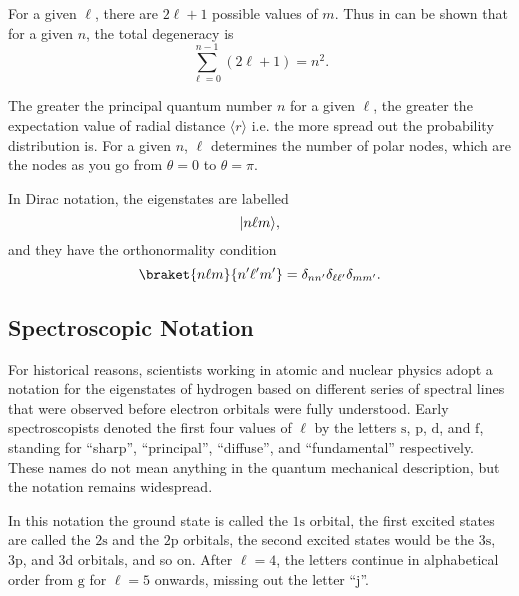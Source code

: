 \documentclass[../quantum_mechanics.tex]{subfiles}
\begin{document}
            For a given $\ell$, there are $2\ell+1$ possible values of $m$.
            Thus in can be shown that for a given $n$, the total degeneracy is
            \begin{equation}
                \sum_{\ell=0}^{n-1}(2\ell+1)=n^2.
            \end{equation}


            The greater the principal quantum number $n$ for a given $\ell$, the greater the expectation value of radial distance $\langle r\rangle$ i.e. the more spread out the probability distribution is.
            For a given $n$, $\ell$ determines the number of polar nodes, which are the nodes as you go from $\theta=0$ to $\theta=\pi$.

            In Dirac notation, the eigenstates are labelled
            \begin{equation}
                \lvert n\ell m\rangle,
            \end{equation}
            and they have the orthonormality condition
            \begin{equation}
                \braket{n\ell m}{n^\prime\ell^\prime m^\prime}=\delta_{nn^\prime}\delta_{\ell\ell^\prime}\delta_{mm^\prime}.
            \end{equation}

        \subsection{Spectroscopic Notation}\label{sec:energy-eigenstates:subsec:spectroscopic-notation}
            For historical reasons, scientists working in atomic and nuclear physics adopt a notation for the eigenstates of hydrogen based on different series of spectral lines that were observed before electron orbitals were fully understood.
            Early spectroscopists denoted the first four values of $\ell$ by the letters $\text{s}$, $\text{p}$, $\text{d}$, and $\text{f}$, standing for ``sharp'', ``principal'', ``diffuse'', and ``fundamental'' respectively.
            These names do not mean anything in the quantum mechanical description, but the notation remains widespread.

            In this notation the ground state is called the $1\text{s}$ orbital, the first excited states are called the $2\text{s}$ and the $2\text{p}$ orbitals, the second excited states would be the $3\text{s}$, $3\text{p}$, and $3\text{d}$ orbitals, and so on.
            After $\ell=4$, the letters continue in alphabetical order from $\text{g}$ for $\ell=5$ onwards, missing out the letter ``j''.
\end{document}
